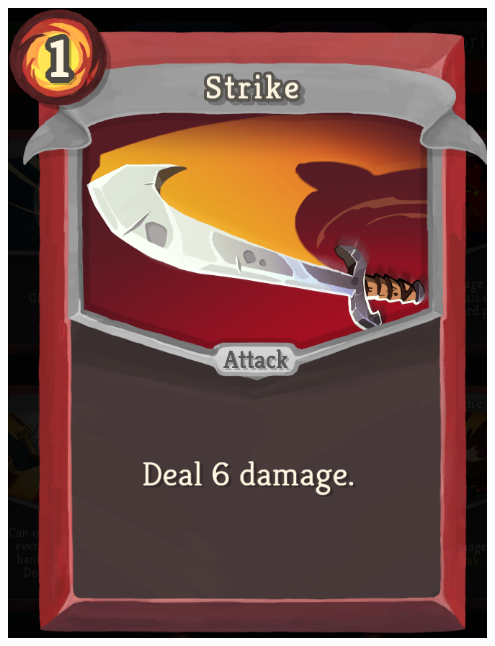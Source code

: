 \begin{center}
\begin{minipage}{.25\textwidth}
        \includegraphics[width=0.95\textwidth]{img/Slay-the-Spire-Strike.png}
        \label{fig:sts-strike}
    \end{minipage}%
    \begin{minipage}{.25\textwidth}
        \centering

\end{minipage}
\end{center}

